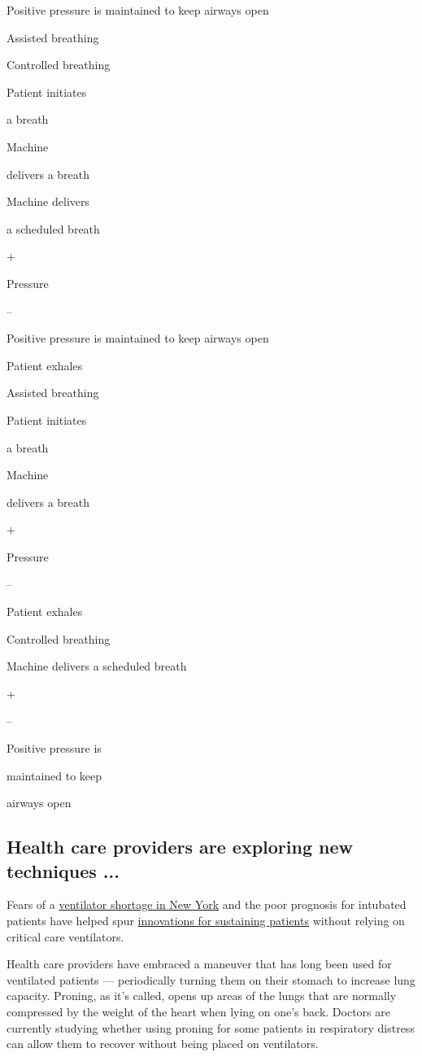 Positive pressure is maintained to keep airways open

Assisted breathing

Controlled breathing

Patient initiates

a breath

Machine

delivers a breath

Machine delivers

a scheduled breath

+

Pressure

--

Positive pressure is maintained to keep airways open

Patient exhales

Assisted breathing

Patient initiates

a breath

Machine

delivers a breath

+

Pressure

--

Patient exhales

Controlled breathing

Machine delivers a scheduled breath

+

--

Positive pressure is

maintained to keep

airways open

\hypertarget{health-care-providers-are-exploring-new-techniques-}{%
\subsection{Health care providers are exploring new techniques
...}\label{health-care-providers-are-exploring-new-techniques-}}

Fears of a
\href{https://www.nytimes3xbfgragh.onion/2020/05/08/nyregion/ventilators-fema-coronavirus-cuomo.html}{ventilator
shortage in New York} and the poor prognosis for intubated patients have
helped spur
\href{https://www.nytimes3xbfgragh.onion/2020/04/17/health/ventilators-coronavirus.html}{innovations
for sustaining patients} without relying on critical care ventilators.

Health care providers have embraced a maneuver that has long been used
for ventilated patients --- periodically turning them on their stomach
to increase lung capacity. Proning, as it's called, opens up areas of
the lungs that are normally compressed by the weight of the heart when
lying on one's back. Doctors are currently studying whether using
proning for some patients in respiratory distress can allow them to
recover without being placed on ventilators.

